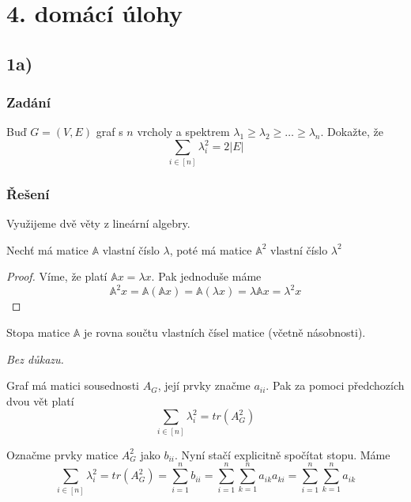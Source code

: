 \documentclass[../main.tex]{subfiles}
\begin{document}
\section{4. domácí úlohy}

\subsection{1a)}
\subsubsection*{Zadání}
Buď $G=(V,E)$ graf s $n$ vrcholy a spektrem $\lambda_1 \geq \lambda_2 \geq \dots \geq \lambda_n$. 
Dokažte, že\begin{equation*}
    \sum_{i\in[n]} \lambda_i^2 = 2|E|
\end{equation*}


\subsubsection*{Řešení}

Využijeme dvě věty z lineární algebry. 

\begin{lemma*}
    Nechť má matice $\mathbb{A}$ vlastní číslo $\lambda$, poté má matice $\mathbb{A}^2$ vlastní číslo $\lambda^2$
\end{lemma*}
\begin{proof}
    Víme, že platí $\mathbb{A}x = \lambda x$. Pak jednoduše máme 
    \begin{equation*}
        \mathbb{A}^2x = \mathbb{A}(\mathbb{A}x) = \mathbb{A}(\lambda x) = \lambda \mathbb{A} x = \lambda^2 x
    \end{equation*}
\end{proof}

\begin{lemma*}
    Stopa matice $\mathbb{A}$ je rovna součtu vlastních čísel matice (včetně násobnosti).

    \textit{Bez důkazu.}
\end{lemma*}


Graf má matici sousednosti $A_G$, její prvky značme $a_{ii}$. Pak za pomoci předchozích dvou vět platí 
\begin{equation*}
    \sum_{i\in[n]} \lambda_i^2 = tr(A_G^2)
\end{equation*} 


Označme prvky matice $A_G^2$ jako $b_{ii}$. Nyní stačí explicitně spočítat stopu. Máme
\begin{equation*}
    \sum_{i\in[n]} \lambda_i^2 = tr(A_G^2) = \sum_{i=1}^n b_{ii} = \sum_{i=1}^n \sum_{k=1}^n a_{ik}a_{ki} = \sum_{i=1}^n \sum_{k=1}^n a_{ik}
\end{equation*} 
\end{document}
